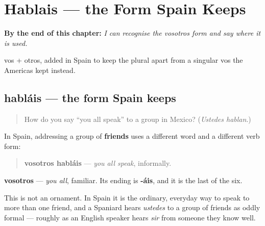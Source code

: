 
\chapter{Hablais --- the Form Spain Keeps}
\label{ch:spanish-hablais}

\begin{chapteropening}
\textbf{By the end of this chapter:} \emph{I can recognise the vosotros form and say where it is used.}

vos + otros, added in Spain to keep the plural apart from a singular vos the Americas kept instead.
\end{chapteropening}

\section[habláis]{habláis — the form Spain keeps}

\label{lesson:ES-C07-hablais}



\begin{quote}
How do you say \textquotedblleft{}you all speak\textquotedblright{} to a group in Mexico? (\emph{Ustedes hablan}.)
\end{quote}

\begin{grammarlens}[title={Grammar Lens: a second plural you}]
In Spain, addressing a group of \textbf{friends} uses a different word and a different verb form:

\begin{quote}
\textbf{vosotros habláis} — \emph{you all speak}, informally.
\end{quote}

\textbf{vosotros} — \emph{you all}, familiar. Its ending is \textbf{-áis}, and it is the last of the six.

This is not an ornament. In Spain it is the ordinary, everyday way to speak to more than one friend, and a Spaniard hears \emph{ustedes} to a group of friends as oddly formal — roughly as an English speaker hears \emph{sir} from someone they know well.
\end{grammarlens}

